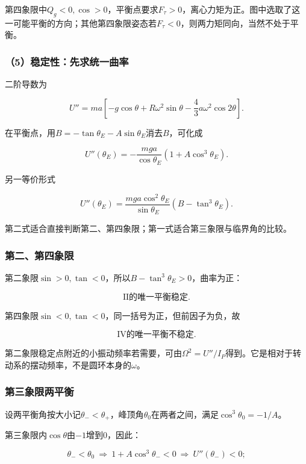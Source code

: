 \documentclass[12pt,a4paper,fontset=fandol]{ctexart}
\begin{document}
第四象限中\(Q_g<0,\cos>0\)，平衡点要求\(F_\tau>0\)，离心力矩为正。图中选取了这一可能平衡的方向；其他第四象限姿态若\(F_\tau<0\)，则两力矩同向，当然不处于平衡。

\subsubsection{（5）稳定性：先求统一曲率}\label{ux7a33ux5b9aux6027ux5148ux6c42ux7edfux4e00ux66f2ux7387}

二阶导数为

\[
U''=ma\left[-g\cos\theta+R\omega^2\sin\theta
-\frac43a\omega^2\cos2\theta\right].
\]

在平衡点，用\(B=-\tan\theta_E-A\sin\theta_E\)消去\(B\)，可化成

\[
\boxed{
U''(\theta_E)
=-\frac{mga}{\cos\theta_E}
(1+A\cos^3\theta_E)}.
\]

另一等价形式

\[
U''(\theta_E)
=\frac{mga\cos^2\theta_E}{\sin\theta_E}
(B-\tan^3\theta_E).
\]

第二式适合直接判断第二、第四象限；第一式适合第三象限与临界角的比较。

\subsubsection{第二、第四象限}\label{ux7b2cux4e8cux7b2cux56dbux8c61ux9650}

第二象限\(\sin>0,\tan<0\)，所以\(B-\tan^3\theta_E>0\)，曲率为正：

\[
\boxed{\mathrm{II}\text{的唯一平衡稳定}}.
\]

第四象限\(\sin<0,\tan<0\)，同一括号为正，但前因子为负，故

\[
\boxed{\mathrm{IV}\text{的唯一平衡不稳定}}.
\]

第二象限稳定点附近的小振动频率若需要，可由\(\Omega^2=U''/I_P\)得到。它是相对于转动系的摆动频率，不是圆环本身的\(\omega\)。

\subsubsection{第三象限两平衡}\label{ux7b2cux4e09ux8c61ux9650ux4e24ux5e73ux8861}

设两平衡角按大小记\(\theta_-<\theta_+\)，峰顶角\(\theta_0\)在两者之间，满足\(\cos^3\theta_0=-1/A\)。

第三象限内\(\cos\theta\)由\(-1\)增到0，因此：

\[
\theta_-<\theta_0
\ \Longrightarrow\ 1+A\cos^3\theta_-<0
\ \Longrightarrow\ U''(\theta_-)<0;
\]
\end{document}
